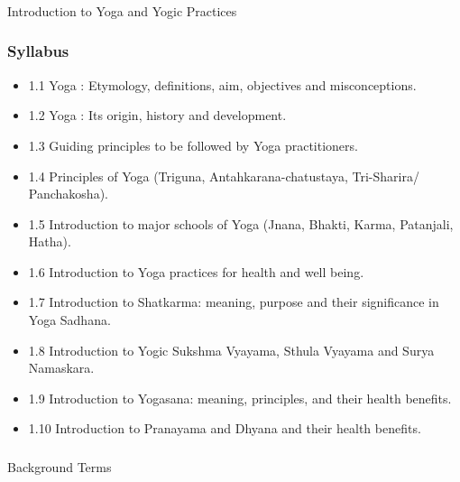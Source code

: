 \begin{frame}[fragile]\frametitle{}
\begin{center}
{\Large Introduction to Yoga and Yogic Practices}
\end{center}
\end{frame}

\begin{frame}[fragile]\frametitle{Syllabus}

\begin{itemize}
\item 1.1  Yoga : Etymology, definitions, aim, objectives and misconceptions. 
\item 1.2  Yoga : Its origin, history and development. 
\item 1.3  Guiding principles to be followed by Yoga practitioners.  
\item 1.4  Principles of Yoga (Triguna, Antahkarana-chatustaya, Tri-Sharira/ Panchakosha). 
\item 1.5  Introduction to major schools of Yoga (Jnana, Bhakti, Karma, Patanjali, Hatha). 
\item 1.6  Introduction to Yoga practices for health and well being. 
\item 1.7  Introduction to Shatkarma: meaning, purpose and their significance in Yoga Sadhana. 
\item 1.8  Introduction to Yogic  Sukshma Vyayama,  Sthula Vyayama and Surya Namaskara.  
\item 1.9  Introduction to Yogasana: meaning, principles, and their health benefits. 
\item 1.10  Introduction to Pranayama and Dhyana and their health benefits. 
\end{itemize}
	  
\end{frame}

\begin{frame}[fragile]\frametitle{}
\begin{center}
{\Large Background Terms}
\end{center}
\end{frame}

